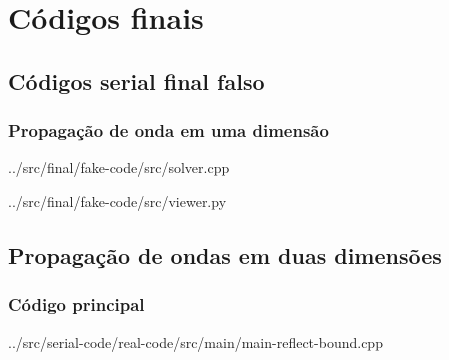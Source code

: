\chapter{Códigos finais}
\section{Códigos serial final falso}
    \subsection{Propagação de onda em uma dimensão}
         
         {../src/final/fake-code/src/solver.cpp}
         
         
         {../src/final/fake-code/src/viewer.py}
    
\section{Propagação de ondas em duas dimensões}
    \subsection{Código principal}
         
         {../src/serial-code/real-code/src/main/main-reflect-bound.cpp}

